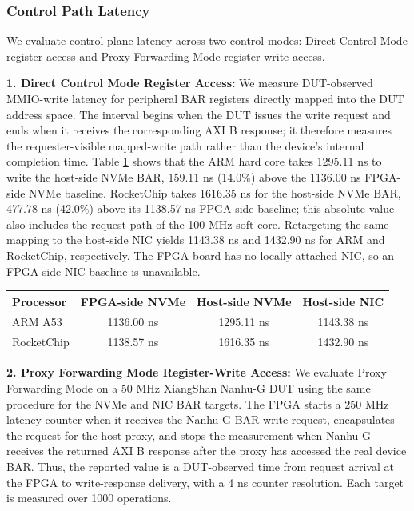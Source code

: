 \documentclass[10pt,conference,letterpaper]{IEEEtran}
\newlength{\scopeTableCaptionWidth}
\newcommand{\scopeTableCaption}[2]{%
    \refstepcounter{table}%
    \settowidth{\scopeTableCaptionWidth}{\footnotesize TABLE~\thetable. #1}%
    \ifdim\scopeTableCaptionWidth>\linewidth
        {\centering\resizebox{\linewidth}{!}{\footnotesize TABLE~\thetable. #1}\par}%
    \else
        {\centering\footnotesize\mbox{TABLE~\thetable. #1}\par}%
    \fi
    \vspace{0.5ex}%
    \label{#2}%
}
\begin{document}
\subsubsection{Control Path Latency}
\label{sec:eval_control_latency}
We evaluate control-plane latency across two control modes: Direct Control Mode register access and Proxy Forwarding Mode register-write access.

\textbf{1. Direct Control Mode Register Access:}
We measure DUT-observed MMIO-write latency for peripheral BAR registers directly mapped into the DUT address space. The interval begins when the DUT issues the write request and ends when it receives the corresponding AXI B response; it therefore measures the requester-visible mapped-write path rather than the device's internal completion time. Table \ref{tab:direct_bar_latency} shows that the ARM hard core takes 1295.11 ns to write the host-side NVMe BAR, 159.11 ns (14.0\%) above the 1136.00 ns FPGA-side NVMe baseline. RocketChip takes 1616.35 ns for the host-side NVMe BAR, 477.78 ns (42.0\%) above its 1138.57 ns FPGA-side baseline; this absolute value also includes the request path of the 100 MHz soft core. Retargeting the same mapping to the host-side NIC yields 1143.38 ns and 1432.90 ns for ARM and RocketChip, respectively. The FPGA board has no locally attached NIC, so an FPGA-side NIC baseline is unavailable.

\begin{table}[htbp]
    \centering
    \scopeTableCaption{Direct Control Mode Register MMIO Write Latency}{tab:direct_bar_latency}
    \renewcommand{\arraystretch}{1}
    \begin{tabular}{@{}lccc@{}}
        \toprule
        \textbf{Processor} & \textbf{FPGA-side NVMe} & \textbf{Host-side NVMe} & \textbf{Host-side NIC} \\
        \midrule
        ARM A53 & 1136.00 ns & 1295.11 ns & 1143.38 ns \\
        RocketChip & 1138.57 ns & 1616.35 ns & 1432.90 ns \\
        \bottomrule
    \end{tabular}
\end{table}

\textbf{2. Proxy Forwarding Mode Register-Write Access:}
We evaluate Proxy Forwarding Mode on a 50 MHz XiangShan Nanhu-G DUT using the same procedure for the NVMe and NIC BAR targets. The FPGA starts a 250 MHz latency counter when it receives the Nanhu-G BAR-write request, encapsulates the request for the host proxy, and stops the measurement when Nanhu-G receives the returned AXI B response after the proxy has accessed the real device BAR. Thus, the reported value is a DUT-observed time from request arrival at the FPGA to write-response delivery, with a 4 ns counter resolution. Each target is measured over 1000 operations.
\end{document}
